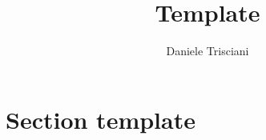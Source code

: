 \documentclass{article}
\title{Template}
\author{Daniele Trisciani}
\date{}
\begin{document}
\maketitle
\setlength{\parindent}{0pt}

\section{Section template}
\end{document}
